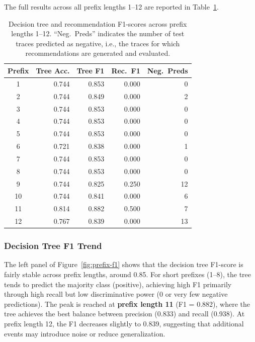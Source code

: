 \documentclass{article}
\begin{document}
\medskip
\noindent
The full results across all prefix lengths 1--12 are reported in Table~\ref{tab:prefix-comparison}.

\begin{table}[H]
\centering
\caption{Decision tree and recommendation F1-scores across prefix lengths 1--12. ``Neg.~Preds'' indicates the number of test traces predicted as negative, i.e., the traces for which recommendations are generated and evaluated.}
\label{tab:prefix-comparison}
\begin{tabular}{crrrr}
\toprule
\textbf{Prefix} & \textbf{Tree Acc.} & \textbf{Tree F1} & \textbf{Rec.\ F1} & \textbf{Neg.\ Preds} \\
\midrule
1  & 0.744 & 0.853 & 0.000 & 0 \\
2  & 0.744 & 0.849 & 0.000 & 2 \\
3  & 0.744 & 0.853 & 0.000 & 0 \\
4  & 0.744 & 0.853 & 0.000 & 0 \\
5  & 0.744 & 0.853 & 0.000 & 0 \\
6  & 0.721 & 0.838 & 0.000 & 1 \\
7  & 0.744 & 0.853 & 0.000 & 0 \\
8  & 0.744 & 0.853 & 0.000 & 0 \\
9  & 0.744 & 0.825 & 0.250 & 12 \\
10 & 0.744 & 0.841 & 0.000 & 6 \\
11 & 0.814 & 0.882 & 0.500 & 7 \\
12 & 0.767 & 0.839 & 0.000 & 13 \\
\bottomrule
\end{tabular}
\end{table}

\subsubsection{Decision Tree F1 Trend}

The left panel of Figure~\ref{fig:prefix-f1} shows that the decision tree F1-score is fairly stable across prefix lengths, around 0.85. For short prefixes (1--8), the tree tends to predict the majority class (positive), achieving high F1 primarily through high recall but low discriminative power (0 or very few negative predictions). The peak is reached at \textbf{prefix length 11} (F1 = 0.882), where the tree achieves the best balance between precision (0.833) and recall (0.938). At prefix length 12, the F1 decreases slightly to 0.839, suggesting that additional events may introduce noise or reduce generalization.
\end{document}
